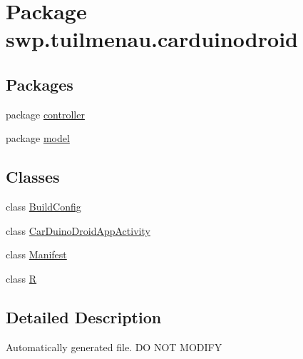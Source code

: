 \hypertarget{namespaceswp_1_1tuilmenau_1_1carduinodroid}{}\section{Package swp.\+tuilmenau.\+carduinodroid}
\label{namespaceswp_1_1tuilmenau_1_1carduinodroid}
\subsection*{Packages}
\begin{DoxyCompactItemize}
\item 
package \hyperlink{namespaceswp_1_1tuilmenau_1_1carduinodroid_1_1controller}{controller}
\item 
package \hyperlink{namespaceswp_1_1tuilmenau_1_1carduinodroid_1_1model}{model}
\end{DoxyCompactItemize}
\subsection*{Classes}
\begin{DoxyCompactItemize}
\item 
class \hyperlink{classswp_1_1tuilmenau_1_1carduinodroid_1_1_build_config}{Build\+Config}
\item 
class \hyperlink{classswp_1_1tuilmenau_1_1carduinodroid_1_1_car_duino_droid_app_activity}{Car\+Duino\+Droid\+App\+Activity}
\item 
class \hyperlink{classswp_1_1tuilmenau_1_1carduinodroid_1_1_manifest}{Manifest}
\item 
class \hyperlink{classswp_1_1tuilmenau_1_1carduinodroid_1_1_r}{R}
\end{DoxyCompactItemize}


\subsection{Detailed Description}
Automatically generated file. D\+O N\+O\+T M\+O\+D\+I\+F\+Y 